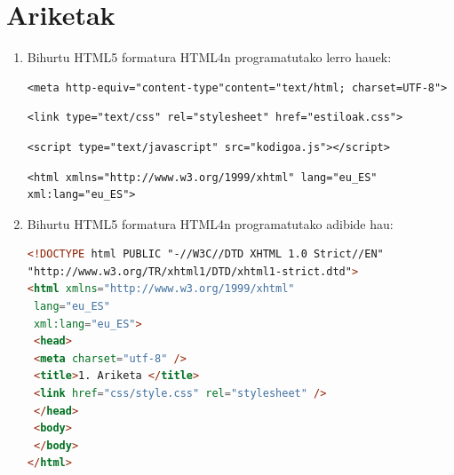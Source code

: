 \section{Ariketak}

\begin{enumerate}

\item Bihurtu HTML5 formatura HTML4n programatutako lerro hauek:

\begin{lstlisting}[numbers=none]
<meta http-equiv="content-type"content="text/html; charset=UTF-8">
\end{lstlisting}
     
\begin{lstlisting}[numbers=none]
<link type="text/css" rel="stylesheet" href="estiloak.css">
\end{lstlisting}
    
\begin{lstlisting}[numbers=none]
<script type="text/javascript" src="kodigoa.js"></script>
\end{lstlisting}

\begin{lstlisting}[numbers=none]
<html xmlns="http://www.w3.org/1999/xhtml" lang="eu_ES" xml:lang="eu_ES">
\end{lstlisting}

\item Bihurtu HTML5 formatura HTML4n programatutako adibide hau:

\begin{lstlisting}[language=HTML,numbers=none]
<!DOCTYPE html PUBLIC "-//W3C//DTD XHTML 1.0 Strict//EN"
"http://www.w3.org/TR/xhtml1/DTD/xhtml1-strict.dtd">
<html xmlns="http://www.w3.org/1999/xhtml"
 lang="eu_ES"
 xml:lang="eu_ES">
 <head>
 <meta charset="utf-8" />
 <title>1. Ariketa </title>
 <link href="css/style.css" rel="stylesheet" />
 </head>
 <body>
 </body>
</html>
\end{lstlisting}
\end{enumerate}